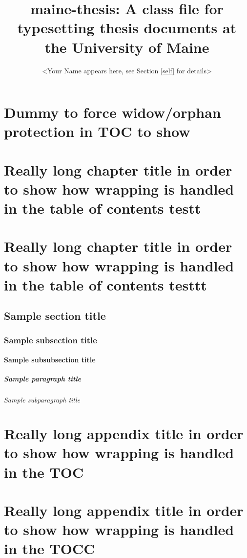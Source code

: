\documentclass{maine-thesis}
\title{maine-thesis: A class file for typesetting thesis documents at the University of Maine}
\author{<Your Name appears here, see Section \ref{self} for details>}
\begin{document}
\preliminary
\titlepage



\chapter{Dummy to force widow/orphan protection in TOC to show}




\chapter{Really long chapter title in order to show how wrapping is handled in the table of contents testt}
\chapter{Really long chapter title in order to show how wrapping is handled in the table of contents testtt}
\blindtext
\section{Sample section title}
\blindtext
\subsection{Sample subsection title}
\blindtext
\subsubsection{Sample subsubsection title}
\blindtext
\paragraph{Sample paragraph title}
\blindtext
\subparagraph{Sample subparagraph title}
\blindtext




\appendix


\chapter{Really long appendix title in order to show how wrapping is handled in the TOC}
\chapter{Really long appendix title in order to show how wrapping is handled in the TOCC}


\end{document}
